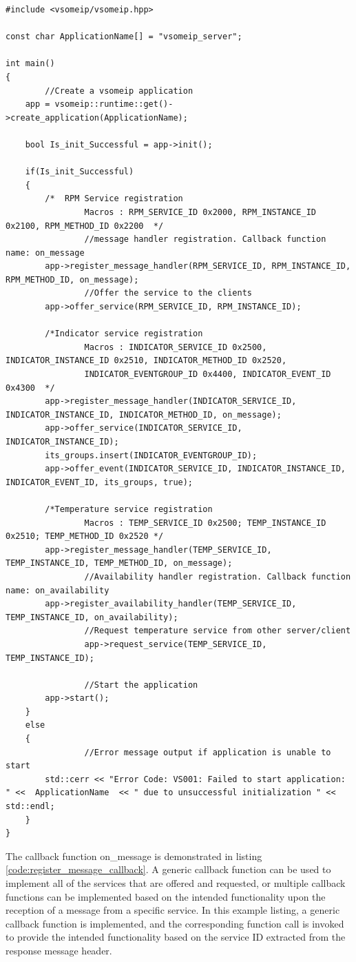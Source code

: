 \begin{lstlisting}[caption={vsomeip application initial configurations}, label=code:init_application]
#include <vsomeip/vsomeip.hpp>

const char ApplicationName[] = "vsomeip_server";

int main()
{
		//Create a vsomeip application
    app = vsomeip::runtime::get()->create_application(ApplicationName);
		
    bool Is_init_Successful = app->init();
		
    if(Is_init_Successful)
    {
        /*  RPM Service registration
				Macros : RPM_SERVICE_ID 0x2000, RPM_INSTANCE_ID 0x2100, RPM_METHOD_ID 0x2200  */
				//message handler registration. Callback function name: on_message
        app->register_message_handler(RPM_SERVICE_ID, RPM_INSTANCE_ID, RPM_METHOD_ID, on_message);
				//Offer the service to the clients
        app->offer_service(RPM_SERVICE_ID, RPM_INSTANCE_ID);

        /*Indicator service registration
				Macros : INDICATOR_SERVICE_ID 0x2500, INDICATOR_INSTANCE_ID 0x2510, INDICATOR_METHOD_ID 0x2520,
				INDICATOR_EVENTGROUP_ID 0x4400, INDICATOR_EVENT_ID 0x4300  */
        app->register_message_handler(INDICATOR_SERVICE_ID, INDICATOR_INSTANCE_ID, INDICATOR_METHOD_ID, on_message);
        app->offer_service(INDICATOR_SERVICE_ID, INDICATOR_INSTANCE_ID);
        its_groups.insert(INDICATOR_EVENTGROUP_ID);
        app->offer_event(INDICATOR_SERVICE_ID, INDICATOR_INSTANCE_ID, INDICATOR_EVENT_ID, its_groups, true);

        /*Temperature service registration 
				Macros : TEMP_SERVICE_ID 0x2500; TEMP_INSTANCE_ID 0x2510; TEMP_METHOD_ID 0x2520 */
        app->register_message_handler(TEMP_SERVICE_ID, TEMP_INSTANCE_ID, TEMP_METHOD_ID, on_message);
				//Availability handler registration. Callback function name: on_availability
        app->register_availability_handler(TEMP_SERVICE_ID, TEMP_INSTANCE_ID, on_availability);
				//Request temperature service from other server/client
				app->request_service(TEMP_SERVICE_ID, TEMP_INSTANCE_ID);
				
				//Start the application
        app->start();
    }
    else
    {
				//Error message output if application is unable to start
        std::cerr << "Error Code: VS001: Failed to start application: " <<  ApplicationName  << " due to unsuccessful initialization " << std::endl;
    }
}
\end{lstlisting}

The callback function on\_message is demonstrated in listing \ref{code:register_message_callback}. A generic callback function can be used to implement all of the services that are offered and requested, or multiple callback functions can be implemented based on the intended functionality upon the reception of a message from a specific service. In this example listing, a generic callback function is implemented, and the corresponding function call is invoked to provide the intended functionality based on the service ID extracted from the response message header.

